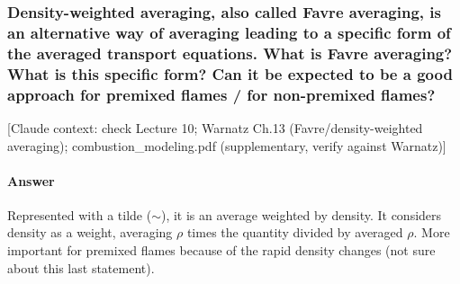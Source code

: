 \subsubsection{Density-weighted averaging, also called Favre averaging, is an alternative way of averaging leading to a specific form of the averaged transport equations. What is Favre averaging? What is this specific form? Can it be expected to be a good approach for premixed flames / for non-premixed flames?}

{\color{gray}\footnotesize [Claude context: check Lecture 10; Warnatz Ch.13 (Favre/density-weighted averaging); combustion\_modeling.pdf (supplementary, verify against Warnatz)]}

\label{Q:density}

\paragraph{Answer} Represented with a tilde ($\sim$), it is an average weighted by density. It considers density as a weight, averaging $\rho$ times the quantity divided by averaged $\rho$. More important for premixed flames because of the rapid density changes (not sure about this last statement).

